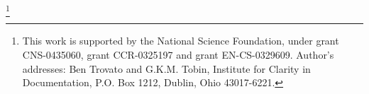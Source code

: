 \thanks{This work is supported by the National Science Foundation,
under grant CNS-0435060, grant CCR-0325197 and grant EN-CS-0329609.
Author's addresses: Ben Trovato {and} G.K.M. Tobin, Institute for Clarity in Documentation, P.O. Box 1212, Dublin, Ohio 43017-6221.}